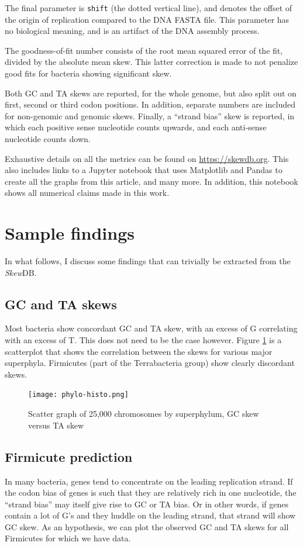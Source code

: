 \documentclass[9pt,twocolumn,twoside]{pnas-new}
\begin{document}
The final parameter is {\tt shift} (the dotted vertical line), and denotes the offset of the origin of replication compared to the DNA FASTA file. This parameter has no biological meaning, and is an artifact of the DNA assembly process. 

The goodness-of-fit number consists of the root mean squared error of the fit, divided by the absolute mean skew. This latter correction is made to not penalize good fits for bacteria showing significant skew.

Both GC and TA skews are reported, for the whole genome, but also split out on first, second or third codon positions. In addition, separate numbers are included for non-genomic and genomic skews. Finally, a ``strand bias'' skew is reported, in which each positive sense nucleotide counts upwards, and each anti-sense nucleotide counts down.

Exhaustive details on all the metrics can be found on \url{https://skewdb.org}. This also includes links to a Jupyter \cite{Kluyver:2016aa} notebook that uses Matplotlib \cite{Hunter:2007} and Pandas \cite{jeff_reback_2021_5203279} to create all the graphs from this article, and many more. In addition, this notebook shows all numerical claims made in this work.

\section*{Sample findings}
In what follows, I discuss some findings that can trivially be extracted from the \emph{Skew}DB. 

\subsection*{GC and TA skews}
Most bacteria show concordant GC and TA skew, with an excess of G correlating with an excess of T. This does not need to be the case however. Figure \ref{fig:gc-ta-scatter} is a scatterplot that shows the correlation between the skews for various major superphyla. Firmicutes (part of the Terrabacteria group) show clearly discordant skews.
\begin{figure}[ht]
\centering
\texttt{[image: phylo-histo.png]}
\caption{Scatter graph of 25,000 chromosomes by superphylum, GC skew versus TA skew}
\label{fig:gc-ta-scatter}
\end{figure}

\subsection*{Firmicute prediction}
In many bacteria, genes tend to concentrate on the leading replication strand. If the codon bias of genes is such that they are relatively rich in one nucleotide, the ``strand bias'' may itself give rise to GC or TA bias. Or in other words, if genes contain a lot of G's and they huddle on the leading strand, that strand will show GC skew. As an hypothesis, we can plot the observed GC and TA skews for all Firmicutes for which we have data.
\end{document}
